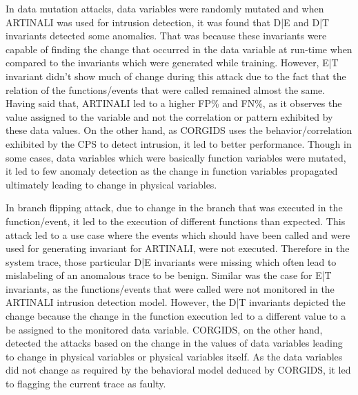 \begin{table}
\centering
  \caption{Results of intrusion detection by CORGIDS for arbitrary attacks on UAV platform}
  \label{tab:CORGIDS_UAV_arbitrary}
\end{table}


In data mutation attacks, data variables were randomly mutated and when ARTINALI was used for intrusion detection, it was found that D|E and D|T invariants detected some anomalies. That was because these invariants were capable of finding the change that occurred in the data variable at run-time when compared to the invariants which were generated while training. However, E|T invariant didn't show much of change during this attack due to the fact that the relation of the functions/events that were called remained almost the same. Having said that, ARTINALI led to a higher FP\% and FN\%, as it observes the value assigned to the variable and not the correlation or pattern exhibited by these data values. On the other hand, as CORGIDS uses the behavior/correlation exhibited by the CPS to detect intrusion, it led to better performance. Though in some cases, data variables which were basically function variables were mutated, it led to few anomaly detection as the change in function variables propagated ultimately leading to change in physical variables.

In branch flipping attack, due to change in the branch that was executed in the function/event, it led to the execution of different functions than expected. This attack led to a use case where the events which should have been called and were used for generating invariant for ARTINALI, were not executed. Therefore in the system trace, those particular D|E invariants were missing which often lead to mislabeling of an anomalous trace to be benign. Similar was the case for E|T invariants, as the functions/events that were called were not monitored in the ARTINALI intrusion detection model. However, the D|T invariants depicted the change because the change in the function execution led to a different value to a be assigned to the monitored data variable. CORGIDS, on the other hand, detected the attacks based on the change in the values of data variables leading to change in physical variables or physical variables itself. As the data variables did not change as required by the behavioral model deduced by CORGIDS, it led to flagging the current trace as faulty.


